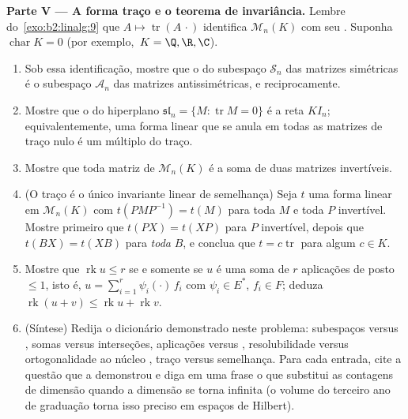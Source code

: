 \begin{problem}
\medskip
\noindent\textbf{Parte V --- A forma traço e o teorema de
invariância.} Lembre do~\cref{exo:b2:linalg:9} que $A \mapsto
\operatorname{tr}(A\,\cdot)$ identifica $\mathcal{M}_n(K)$ com
seu . Suponha $\operatorname{char} K = 0$ (por exemplo,\ $K = \Q, \R,
\C$).
\begin{enumerate}[resume]
  \item Sob essa identificação, mostre que o  do
        subespaço $\mathcal{S}_n$ das matrizes simétricas é o
        subespaço $\mathcal{A}_n$ das matrizes antissimétricas, e
        reciprocamente.
  \item Mostre que o  do hiperplano
        $\mathfrak{sl}_n = \{M : \operatorname{tr} M = 0\}$ é
        a reta $K I_n$; equivalentemente, uma forma linear que se anula
        em todas as matrizes de traço nulo é um múltiplo do traço.
  \item Mostre que toda matriz de $\mathcal{M}_n(K)$ é a soma
        de duas matrizes invertíveis.
  \item (O traço é o único invariante linear de semelhança) Seja
        $t$ uma forma linear em $\mathcal{M}_n(K)$ com
        $t(PMP^{-1}) = t(M)$ para toda $M$ e toda
        $P$ invertível. Mostre primeiro que $t(PX) = t(XP)$ para $P$ invertível, depois
        que $t(BX) = t(XB)$ para \emph{toda} $B$, e conclua que $t = c
        \operatorname{tr}$ para algum $c \in K$.
  \item Mostre que $\operatorname{rk} u \leq r$ se e somente se $u$
        é uma soma de $r$ aplicações de posto $\leq 1$, isto é, $u =
        \sum_{i=1}^{r} \psi_i(\cdot)\,f_i$ com $\psi_i \in E^*$,
        $f_i \in F$; deduza $\operatorname{rk}(u + v) \leq
        \operatorname{rk} u + \operatorname{rk} v$.
  \item (Síntese) Redija o dicionário demonstrado neste
        problema: subespaços versus , somas versus
        interseções, aplicações versus , resolubilidade versus
        ortogonalidade ao núcleo , traço versus
        semelhança. Para cada entrada, cite a questão que a demonstrou
        e diga em uma frase o que substitui as contagens de dimensão
        quando a dimensão se torna infinita (o volume do terceiro ano de graduação
        torna isso preciso em espaços de Hilbert).
\end{enumerate}
\end{problem}
